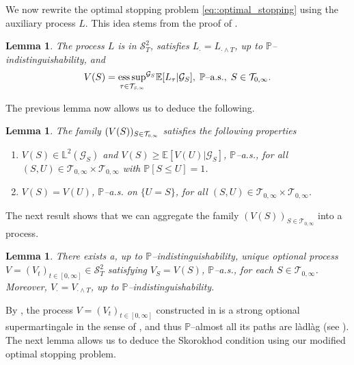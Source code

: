\documentclass[10pt]{article} %
\newtheorem{lemma}[theorem]{Lemma}
\newcommand\cG{\mathcal G}
\newcommand\cS{\mathcal S}
\newcommand\cT{\mathcal T}
\newcommand{\smalltext}[1]{\text{\fontsize{4}{4}\selectfont$#1$}}
\def \E{\mathbb{E}}
\def \L{\mathbb{L}}
\def \P{\mathbb{P}}
\newcommand{\1}{\mathbf{1}}
\DeclareMathOperator*{\esssup}{ess\,sup}
\begin{document}
We now rewrite the optimal stopping problem \eqref{eq::optimal_stopping} using the auxiliary process $L$. This idea stems from the proof of \cite[Proposition 6.3.2]{zhang2017backward}.
	
	
\begin{lemma}\label{lem::snell_reformulation}
	The process $L$ is in $\cS^2_T$, satisfies $L_\cdot = L_{\cdot \land T}$, up to $\P$--indistinguishability, and
	\begin{equation*}
		V(S) = {\esssup_{\tau \in \cT_{\smalltext{S}\smalltext{,}\smalltext{\infty}}}}^{\cG_S} \E[ L_\tau | \cG_S ], \; \text{$\P$\rm--a.s.}, \; S \in \cT_{0,\infty}.
	\end{equation*}
\end{lemma}

The previous lemma now allows us to deduce the following.



\begin{lemma}\label{lem::supermartingale_family}
	The family $(V(S))_{S \in \cT_{\smalltext{0}\smalltext{,}\smalltext{\infty}}}$ satisfies the following properties
	\begin{enumerate}
		\item[$(i)$] $V(S) \in \L^2(\cG_S)$ and $V(S) \geq \E[V(U)|\cG_S]$, $\P${\rm--a.s.}, for all $(S,U) \in \cT_{0,\infty} \times \cT_{0,\infty}$ with $\P[S \leq U] = 1$.
		\item[$(ii)$] $V(S) = V(U)$, $\P${\rm--a.s.} on $\{U = S\}$, for all $(S,U) \in \cT_{0,\infty} \times \cT_{0,\infty}$.
	\end{enumerate}
\end{lemma}



The next result shows that we can aggregate the family $(V(S))_{S \in \cT_{0,\infty}}$ into a process.
\begin{lemma}\label{lem::snell_aggregation}
	There exists a, up to $\P$--indistinguishability, unique optional process $V = (V_t)_{t \in [0,\infty]} \in \cS^2_T$ satisfying $V_S = V(S)$, $\P$--{\rm a.s.}, for each $S \in \cT_{0,\infty}$. Moreover, $V_\cdot = V_{\cdot \land T}$, up to $\P$--indistinguishability.
\end{lemma}



By , the process $V = (V_t)_{t \in [0,\infty]}$ constructed in  is a strong optional supermartingale in the sense of \cite[Appendix I]{dellacherie1982probabilities}, and thus $\P$--almost all its paths are l\`adl\`ag (see \cite[Appendix I, Theorem 4]{dellacherie1982probabilities}). 
The next lemma allows us to deduce the Skorokhod condition using our modified optimal stopping problem.
\end{document}
